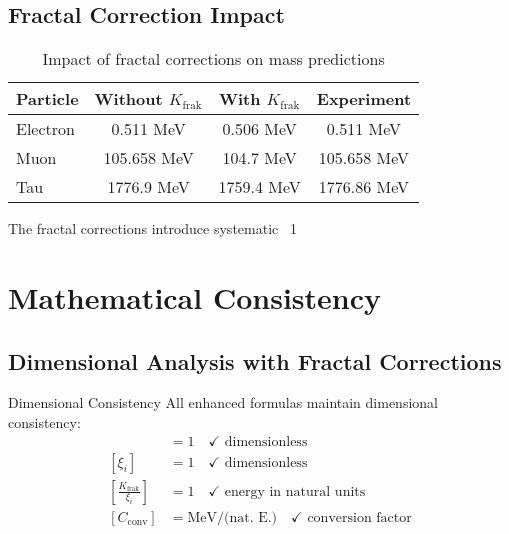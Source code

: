\documentclass[12pt,a4paper]{article}
\begin{document}
	\subsection{Fractal Correction Impact}
	\label{subsec:fractal_impact}
	
	\begin{table}[H]
		\centering
		\begin{tabular}{lccc}
			\toprule
			\textbf{Particle} & \textbf{Without $K_{\text{frak}}$} & \textbf{With $K_{\text{frak}}$} & \textbf{Experiment} \\
			\midrule
			Electron & 0.511 MeV & 0.506 MeV & 0.511 MeV \\
			Muon & 105.658 MeV & 104.7 MeV & 105.658 MeV \\
			Tau & 1776.9 MeV & 1759.4 MeV & 1776.86 MeV \\
			\bottomrule
		\end{tabular}
		\caption{Impact of fractal corrections on mass predictions}
		\label{tab:fractal_impact}
	\end{table}
	
	The fractal corrections introduce systematic ~1%
	
	\section{Mathematical Consistency}
	\label{sec:mathematical_consistency}
	
	\subsection{Dimensional Analysis with Fractal Corrections}
	\label{subsec:dimensional_analysis}
	
	\begin{important}{Dimensional Consistency}{}
		All enhanced formulas maintain dimensional consistency:
		\begin{align}
			[K_{\text{frak}}] &= 1 \quad \checkmark \text{ dimensionless} \\
			[\xi_i] &= 1 \quad \checkmark \text{ dimensionless} \\
			\left[\frac{K_{\text{frak}}}{\xi_i}\right] &= 1 \quad \checkmark \text{ energy in natural units} \\
			[C_{\text{conv}}] &= \text{MeV/(nat. E.)} \quad \checkmark \text{ conversion factor}
		\end{align}
	\end{important}
	
\end{document}
